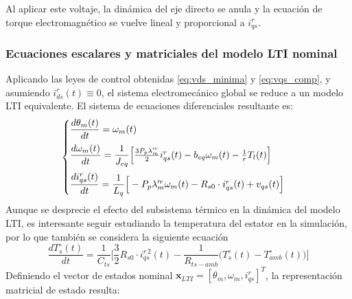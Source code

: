 \documentclass[12pt, a4paper,journal, onecolumn, compsoc]{IEEEtran}
\begin{document}
Al aplicar este voltaje, la dinámica del eje directo se anula y la ecuación de torque electromagnético se vuelve lineal y proporcional a $i_{qs}^r$.

\subsubsection{Ecuaciones escalares y matriciales del modelo LTI nominal}
Aplicando las leyes de control obtenidas \eqref{eq:vds_minima} y \eqref{eq:vqs_comp}, y asumiendo $i_{ds}^r(t) \equiv 0$, el sistema electromecánico global se reduce a un modelo LTI equivalente. El sistema de ecuaciones diferenciales resultante es:
\begin{equation} \label{eq:sis_escalar_LTI}
\begin{cases}
    \vspace{0.2cm}
    \dfrac{d\theta_m(t)}{dt} = \omega_m(t) \\
    \vspace{0.2cm}
    \dfrac{d\omega_m(t)}{dt} = \dfrac{1}{J_{eq}}\Big[\frac{3 P_p \lambda'^r_m}{2} i_{qs}^r(t) - b_{eq} \omega_m(t) - \frac{1}{r} T_l(t)\Big] \\
    \dfrac{di_{qs}^r(t)}{dt} = \dfrac{1}{L_q}\Big[-P_p \lambda'^r_m \omega_m(t) - R_{s0}\cdot i_{qs}^r(t) + v_{qs}(t)\Big]
\end{cases}
\end{equation}
Aunque se desprecie el efecto del subsistema térmico en la dinámica del modelo LTI, es interesante seguir estudiando la temperatura del estator en la simulación, por lo que también se considera la siguiente ecuación
\[\dfrac{dT_s^\circ(t)}{dt} = \dfrac{1}{C_{ts}}\Big[\frac{3}{2}R_{s0}\cdot i_{qs}^{r\,2}(t)-\frac{1}{R_{ts-amb}}\big(T_s^\circ(t) - T_{amb}^\circ(t)\big)\Big]\]
Definiendo el vector de estados nominal $\mathbf{x}_{LTI} = [\theta_m, \omega_m, i_{qs}^r]^T$, la representación matricial de estado resulta:
\end{document}
